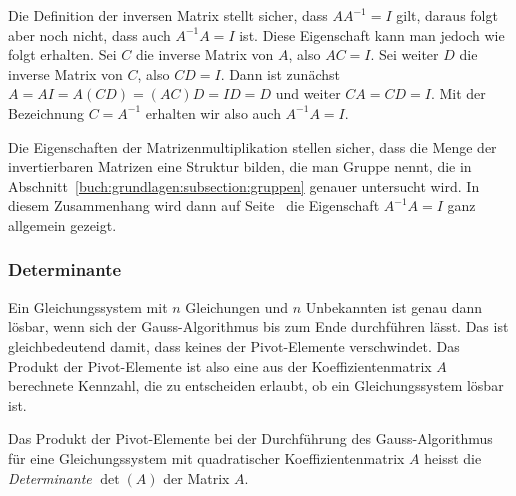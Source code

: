 Die Definition der inversen Matrix stellt sicher, dass $AA^{-1}=I$ gilt,
daraus folgt aber noch nicht, dass auch $A^{-1}A=I$ ist.
Diese Eigenschaft kann man jedoch wie folgt erhalten.
Sei $C$ die inverse Matrix von $A$, also $AC=I$.
Sei weiter $D$ die inverse Matrix von $C$, also $CD=I$.
Dann ist zunächst $A=AI=A(CD)=(AC)D=ID=D$ und weiter
$CA=CD=I$.
Mit der Bezeichnung $C=A^{-1}$ erhalten wir also auch $A^{-1}A=I$.

Die Eigenschaften der Matrizenmultiplikation stellen sicher,
dass die Menge der invertierbaren Matrizen eine Struktur bilden,
die man Gruppe nennt, die in Abschnitt~\ref{buch:grundlagen:subsection:gruppen}
genauer untersucht wird.
In diesem Zusammenhang wird dann auf
Seite~\pageref{buch:vektorenmatrizen:satz:gruppenregeln}
die Eigenschaft $A^{-1}A=I$ ganz allgemein gezeigt.

\subsubsection{Determinante}
Ein Gleichungssystem mit $n$ Gleichungen und $n$ Unbekannten ist genau
dann lösbar, wenn sich der Gauss-Algorithmus bis zum Ende durchführen lässt.
Das ist gleichbedeutend damit, dass keines der Pivot-Elemente verschwindet.
Das Produkt der Pivot-Elemente ist also eine aus der Koeffizientenmatrix
$A$ berechnete Kennzahl, die zu entscheiden erlaubt, ob ein Gleichungssystem
lösbar ist.

\begin{definition}
\label{buch:linear:determinate:def}
Das Produkt der Pivot-Elemente bei der Durchführung des Gauss-Algorithmus
für eine Gleichungssystem mit quadratischer Koeffizientenmatrix $A$
heisst die {\em Determinante} $\det(A)$ der Matrix $A$.
%
\end{definition}

